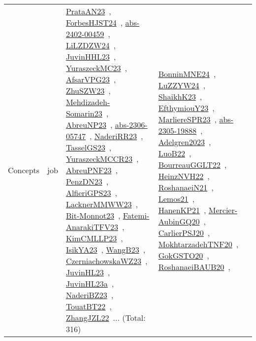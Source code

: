 {\begin{longtable}{lp{3cm}>{\raggedright\arraybackslash}p{6cm}>{\raggedright\arraybackslash}p{6cm}>{\raggedright\arraybackslash}p{8cm}}
Concepts & job & \href{../works/PrataAN23.pdf}{PrataAN23}~\cite{PrataAN23}, \href{../works/ForbesHJST24.pdf}{ForbesHJST24}~\cite{ForbesHJST24}, \href{../works/abs-2402-00459.pdf}{abs-2402-00459}~\cite{abs-2402-00459}, \href{../works/LiLZDZW24.pdf}{LiLZDZW24}~\cite{LiLZDZW24}, \href{../works/JuvinHHL23.pdf}{JuvinHHL23}~\cite{JuvinHHL23}, \href{../works/YuraszeckMC23.pdf}{YuraszeckMC23}~\cite{YuraszeckMC23}, \href{../works/AfsarVPG23.pdf}{AfsarVPG23}~\cite{AfsarVPG23}, \href{../works/ZhuSZW23.pdf}{ZhuSZW23}~\cite{ZhuSZW23}, \href{../works/Mehdizadeh-Somarin23.pdf}{Mehdizadeh-Somarin23}~\cite{Mehdizadeh-Somarin23}, \href{../works/AbreuNP23.pdf}{AbreuNP23}~\cite{AbreuNP23}, \href{../works/abs-2306-05747.pdf}{abs-2306-05747}~\cite{abs-2306-05747}, \href{../works/NaderiRR23.pdf}{NaderiRR23}~\cite{NaderiRR23}, \href{../works/TasselGS23.pdf}{TasselGS23}~\cite{TasselGS23}, \href{../works/YuraszeckMCCR23.pdf}{YuraszeckMCCR23}~\cite{YuraszeckMCCR23}, \href{../works/AbreuPNF23.pdf}{AbreuPNF23}~\cite{AbreuPNF23}, \href{../works/PenzDN23.pdf}{PenzDN23}~\cite{PenzDN23}, \href{../works/AlfieriGPS23.pdf}{AlfieriGPS23}~\cite{AlfieriGPS23}, \href{../works/LacknerMMWW23.pdf}{LacknerMMWW23}~\cite{LacknerMMWW23}, \href{../works/Bit-Monnot23.pdf}{Bit-Monnot23}~\cite{Bit-Monnot23}, \href{../works/Fatemi-AnarakiTFV23.pdf}{Fatemi-AnarakiTFV23}~\cite{Fatemi-AnarakiTFV23}, \href{../works/KimCMLLP23.pdf}{KimCMLLP23}~\cite{KimCMLLP23}, \href{../works/IsikYA23.pdf}{IsikYA23}~\cite{IsikYA23}, \href{../works/WangB23.pdf}{WangB23}~\cite{WangB23}, \href{../works/CzerniachowskaWZ23.pdf}{CzerniachowskaWZ23}~\cite{CzerniachowskaWZ23}, \href{../works/JuvinHL23.pdf}{JuvinHL23}~\cite{JuvinHL23}, \href{../works/JuvinHL23a.pdf}{JuvinHL23a}~\cite{JuvinHL23a}, \href{../works/NaderiBZ23.pdf}{NaderiBZ23}~\cite{NaderiBZ23}, \href{../works/TouatBT22.pdf}{TouatBT22}~\cite{TouatBT22}, \href{../works/ZhangJZL22.pdf}{ZhangJZL22}~\cite{ZhangJZL22}... (Total: 316) & \href{../works/BonninMNE24.pdf}{BonninMNE24}~\cite{BonninMNE24}, \href{../works/LuZZYW24.pdf}{LuZZYW24}~\cite{LuZZYW24}, \href{../works/ShaikhK23.pdf}{ShaikhK23}~\cite{ShaikhK23}, \href{../works/EfthymiouY23.pdf}{EfthymiouY23}~\cite{EfthymiouY23}, \href{../works/MarliereSPR23.pdf}{MarliereSPR23}~\cite{MarliereSPR23}, \href{../works/abs-2305-19888.pdf}{abs-2305-19888}~\cite{abs-2305-19888}, \href{../works/Adelgren2023.pdf}{Adelgren2023}~\cite{Adelgren2023}, \href{../works/LuoB22.pdf}{LuoB22}~\cite{LuoB22}, \href{../works/BourreauGGLT22.pdf}{BourreauGGLT22}~\cite{BourreauGGLT22}, \href{../works/HeinzNVH22.pdf}{HeinzNVH22}~\cite{HeinzNVH22}, \href{../works/RoshanaeiN21.pdf}{RoshanaeiN21}~\cite{RoshanaeiN21}, \href{../works/Lemos21.pdf}{Lemos21}~\cite{Lemos21}, \href{../works/HanenKP21.pdf}{HanenKP21}~\cite{HanenKP21}, \href{../works/Mercier-AubinGQ20.pdf}{Mercier-AubinGQ20}~\cite{Mercier-AubinGQ20}, \href{../works/CarlierPSJ20.pdf}{CarlierPSJ20}~\cite{CarlierPSJ20}, \href{../works/MokhtarzadehTNF20.pdf}{MokhtarzadehTNF20}~\cite{MokhtarzadehTNF20}, \href{../works/GokGSTO20.pdf}{GokGSTO20}~\cite{GokGSTO20}, \href{../works/RoshanaeiBAUB20.pdf}{RoshanaeiBAUB20}~\cite{RoshanaeiBAUB20}, 
\end{longtable}}
